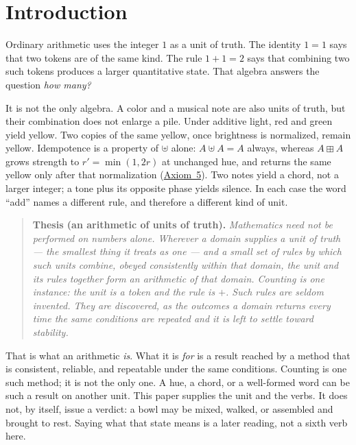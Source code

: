\documentclass[12pt, a4paper]{article}
\begin{document}
\section{Introduction}

Ordinary arithmetic uses the integer $1$ as a unit of truth.
The identity $1=1$ says that two tokens are of the same kind.
The rule $1+1=2$ says that combining two such tokens produces a
larger quantitative state. That algebra answers the question
\emph{how many?}

It is not the only algebra. A color and a musical note are also
units of truth, but their combination does not enlarge a pile.
Under additive light, red and green yield yellow. Two copies of
the same yellow, once brightness is normalized, remain yellow.
Idempotence is a property of $\uplus$ alone: $A\uplus A=A$ always,
whereas $A\boxplus A$ grows strength to $r'=\min(1,2r)$ at unchanged
hue, and returns the same yellow only after that normalization
(\hyperref[subsec:axiom_interference]{Axiom~5}).
Two notes yield a chord, not a larger integer; a tone plus its
opposite phase yields silence. In each case the word ``add''
names a different rule, and therefore a different kind of unit.

\begin{quote}
\textbf{Thesis (an arithmetic of units of truth).}
\emph{Mathematics need not be performed on numbers alone. Wherever a
domain supplies a unit of truth --- the smallest thing it treats as
one --- and a small set of rules by which such units combine, obeyed
consistently within that domain, the unit and its rules together form
an arithmetic of that domain. Counting is one instance: the unit is a
token and the rule is $+$. Such rules are seldom invented. They are
discovered, as the outcomes a domain returns every time the same
conditions are repeated and it is left to settle toward stability.}
\end{quote}

That is what an arithmetic \emph{is}. What it is \emph{for} is a
result reached by a method that is consistent, reliable, and
repeatable under the same conditions. Counting is one such method; it
is not the only one. A hue, a chord, or a well-formed word can be
such a result on another unit. This paper supplies the unit and the
verbs. It does not, by itself, issue a verdict: a bowl may be mixed,
walked, or assembled and brought to rest. Saying what that state
means is a later reading, not a sixth verb here.
\end{document}
